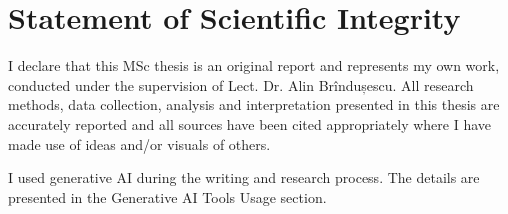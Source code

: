 \newpage
\section*{Statement of Scientific Integrity}

I declare that this MSc thesis is an original report and represents my own work, conducted under the supervision of Lect. Dr. Alin Brîndușescu. All research methods, data collection, analysis and interpretation presented in this thesis are accurately reported and all sources have been cited appropriately where I have made use of ideas and/or visuals of others.

I used generative AI during the writing and research process. The details are presented in the Generative AI Tools Usage section.
